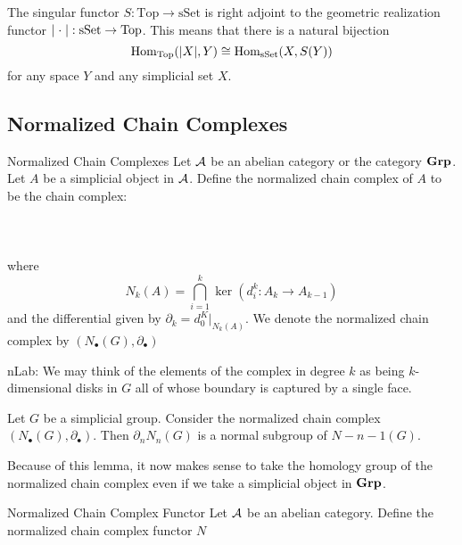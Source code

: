 \documentclass[a4paper]{article}
\begin{document}
\begin{thm}{}{} The singular functor $S:\text{Top}\to\text{sSet}$ is right adjoint to the geometric realization functor $\abs{\;\cdot\;}:\text{sSet}\to\text{Top}$. This means that there is a natural bijection $$\operatorname{Hom}_\text{Top}(\abs{X},Y)\cong\operatorname{Hom}_\text{sSet}(X,S(Y))$$ for any space $Y$ and any simplicial set $X$. 
\end{thm}

\subsection{Normalized Chain Complexes}
\begin{defn}{Normalized Chain Complexes}{} Let $\mathcal{A}$ be an abelian category or the category $\bold{Grp}$. Let $A$ be a simplicial object in $\mathcal{A}$. Define the normalized chain complex of $A$ to be the chain complex: \\~\\
\\~\\
where $$N_k(A)=\bigcap_{i=1}^k\ker(d_i^k:A_k\to A_{k-1})$$ and the differential given by $\partial_k=d_0^K|_{N_k(A)}$. We denote the normalized chain complex by $(N_\bullet(G),\partial_\bullet)$
\end{defn}

nLab: We may think of the elements of the complex in degree $k$ as being $k$-dimensional disks in $G$ all of whose boundary is captured by a single face. 

\begin{lmm}{}{} Let $G$ be a simplicial group. Consider the normalized chain complex $(N_\bullet(G),\partial_\bullet)$. Then $\partial_n N_n(G)$ is a normal subgroup of $N-{n-1}(G)$. 
\end{lmm}

Because of this lemma, it now makes sense to take the homology group of the normalized chain complex even if we take a simplicial object in $\bold{Grp}$. 

\begin{defn}{Normalized Chain Complex Functor}{} Let $\mathcal{A}$ be an abelian category. Define the normalized chain complex functor $N$
\end{defn}
\end{document}
